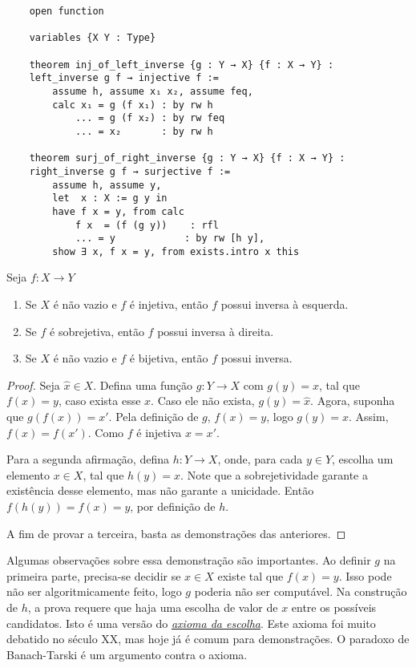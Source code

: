 \begin{lstlisting}
    open function 

    variables {X Y : Type}

    theorem inj_of_left_inverse {g : Y → X} {f : X → Y} :
    left_inverse g f → injective f :=
        assume h, assume x₁ x₂, assume feq, 
        calc x₁ = g (f x₁) : by rw h
            ... = g (f x₂) : by rw feq
            ... = x₂       : by rw h

    theorem surj_of_right_inverse {g : Y → X} {f : X → Y} :
    right_inverse g f → surjective f :=
        assume h, assume y,
        let  x : X := g y in
        have f x = y, from calc
            f x  = (f (g y))    : rfl
            ... = y            : by rw [h y],
        show ∃ x, f x = y, from exists.intro x this
\end{lstlisting}

\begin{theorem}
    \label{prop6}
    Seja $f: X \to Y$
    \renewcommand{\labelenumi}{\Roman{enumi}}
    \begin{enumerate}
        \item Se $X$ é não vazio e $f$ é injetiva, então $f$ possui inversa à esquerda.
        \item Se $f$ é sobrejetiva, então $f$ possui inversa à direita.
        \item Se $X$ é não vazio e $f$ é bijetiva, então $f$ possui inversa.
    \end{enumerate}
\end{theorem}

\begin{proof}
    Seja $\hat{x} \in X$. Defina uma função $g: Y \to X$ com $g(y) = x$, tal que $f(x) = y$,
    caso exista esse $x$. Caso ele não exista, $g(y) = \hat{x}$. Agora, suponha que 
    $g(f(x)) = x'$. Pela definição de $g$, $f(x) = y$, logo $g(y) = x$. Assim, $f(x) = f(x')$.
    Como $f$ é injetiva $x = x'$. 

    Para a segunda afirmação, defina $h: Y \to X$, onde, para cada $y \in Y$, escolha um elemento 
    $x \in X$, tal que $h(y) = x$. Note que a sobrejetividade garante a existência desse elemento,
    mas não garante a unicidade. Então $f(h(y)) = f(x) = y$, por definição de $h$. 

    A fim de provar a terceira, basta as demonstrações das anteriores. 
\end{proof}

Algumas observações sobre essa demonstração são importantes. Ao definir $g$ na primeira parte, 
precisa-se decidir se $x \in X$ existe tal que $f(x) = y$. Isso pode não ser algoritmicamente 
feito, logo $g$ poderia não ser computável. Na construção de $h$, a prova requere que haja 
uma escolha de valor de $x$ entre os possíveis candidatos. Isto é uma versão do 
\href{https://pt.wikipedia.org/wiki/Axioma_da_escolha#Enunciado}{\textit{axioma da escolha}}. 
Este axioma foi muito debatido no século XX, mas hoje já é comum para demonstrações. O paradoxo
de Banach-Tarski é um argumento contra o axioma.

